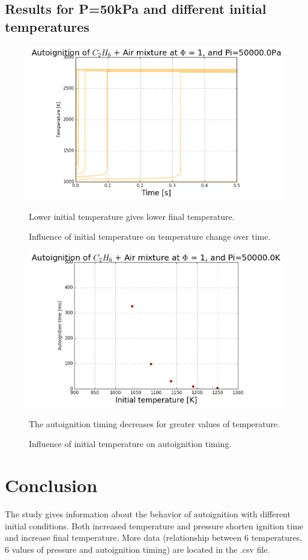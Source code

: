 \documentclass[11pt]{article}
\begin{document}
\subsection{Results for P=50kPa and different initial temperatures}
\begin{figure} [H]
	\begin{center}
\includegraphics[height=0.5\textwidth]{P0_T_Trange_UV}
        \caption{Influence of initial temperature on temperature change over time.}
    \end{center}
\normalsize
{Lower initial temperature gives lower final temperature.}
\end{figure}

\begin{figure} [H]
	\begin{center}
\includegraphics[height=0.5\textwidth]{P0_Autoignition}
        \caption{Influence of initial temperature on autoignition timing.}
    \end{center}
\normalsize
{The autoignition timing decreases for greater values of temperature.}
\end{figure}




\section{Conclusion}
The study gives information about the behavior of autoignition with different initial conditions. Both increased temperature and pressure shorten ignition time and increase final temperature. More data (relationship between 6 temperatures, 6 values of pressure and autoignition timing) are located in the .csv file.
\end{document}
